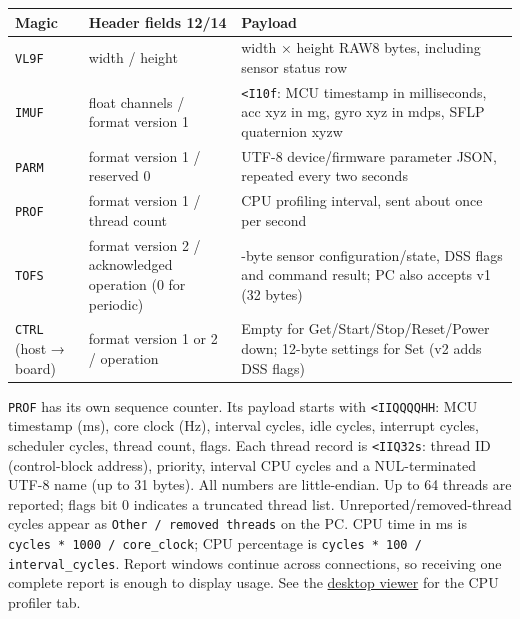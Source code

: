 \documentclass[10pt,a4paper,oneside]{report}
\begin{document}
{\def\LTcaptype{none} %
\begin{longtable}[]{@{}
  >{\raggedright\arraybackslash}p{}
  >{\raggedright\arraybackslash}p{}
  >{\raggedright\arraybackslash}p{}@{}}
\toprule\noalign{}
\begin{minipage}[b]{\linewidth}\raggedright
\textbf{Magic}
\end{minipage} & \begin{minipage}[b]{\linewidth}\raggedright
\textbf{Header fields 12/14}
\end{minipage} & \begin{minipage}[b]{\linewidth}\raggedright
\textbf{Payload}
\end{minipage} \\
\midrule\noalign{}
\endhead
\bottomrule\noalign{}
\endlastfoot
\texttt{VL9F} & width / height & width × height RAW8 bytes, including sensor status row \\
\texttt{IMUF} & 10 float channels / format version 1 & \texttt{<I10f}: MCU timestamp in milliseconds, acc xyz in mg, gyro xyz in mdps, SFLP quaternion xyzw \\
\texttt{PARM} & format version 1 / reserved 0 & UTF-8 device/firmware parameter JSON, repeated every two seconds \\
\texttt{PROF} & format version 1 / thread count & CPU profiling interval, sent about once per second \\
\texttt{TOFS} & format version 2 / acknowledged operation (0 for periodic) & 36-byte sensor configuration/state, DSS flags and command result; PC also accepts v1 (32 bytes) \\
\texttt{CTRL} (host → board) & format version 1 or 2 / operation & Empty for Get/Start/Stop/Reset/Power down; 12-byte settings for Set (v2 adds DSS flags) \\
\end{longtable}
}

\texttt{PROF} has its own sequence counter. Its payload starts with \texttt{<IIQQQQHH}: MCU timestamp (ms), core clock (Hz), interval cycles, idle cycles, interrupt cycles, scheduler cycles, thread count, flags. Each thread record is \texttt{<IIQ32s}: thread ID (control-block address), priority, interval CPU cycles and a NUL-terminated UTF-8 name (up to 31 bytes). All numbers are little-endian. Up to 64 threads are reported; flags bit 0 indicates a truncated thread list. Unreported/removed-thread cycles appear as \texttt{Other /\allowbreak{} removed threads} on the PC. CPU time in ms is \texttt{cycles * 1000 /\allowbreak{} core\_\allowbreak{}clock}; CPU percentage is \texttt{cycles * 100 /\allowbreak{} interval\_\allowbreak{}cycles}. Report windows continue across connections, so receiving one complete report is enough to display usage. See the \hyperref[wiki-tools-device-monitor--device-monitor]{desktop viewer} for the CPU profiler tab.
\end{document}
